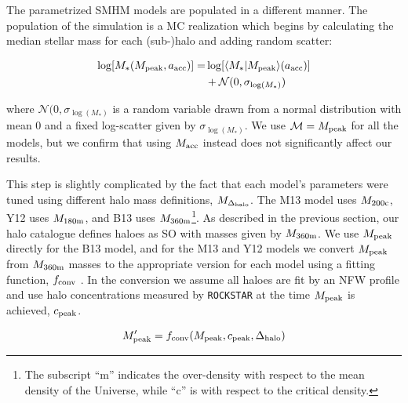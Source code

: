 \documentclass[a4paper,fleqn,usenatbib]{mnras}
\begin{document}
The parametrized SMHM models are populated in a different manner.  The population of the simulation is a MC realization which begins by calculating the median stellar mass for each (sub-)halo and adding random scatter:
%
\begin{linenomath}
\begin{align}
\label{eq:mstar_assign}
\log[M_*(M_{\rm peak}, a_{\rm acc})] =& \log[\langle M_* | M_{\rm peak}\rangle(a_{\rm acc})] \\ \nonumber
&+ \mathcal{N}(0,\sigma_{\log(M_*)})
\end{align}
\end{linenomath}
%
where $\mathcal{N}(0,\sigma_{\log(M_*)}$ is a random variable drawn from a normal distribution with mean 0 and a fixed log-scatter given by $\sigma_{\log(M_*)}$.  We use $\mathcal{M} = M_{\rm peak}$ for all the models, but we confirm that using $M_{\rm acc}$ instead does not significantly affect our results.

This step is slightly complicated by the fact that each model's parameters were tuned using different halo mass definitions, $M_{\Delta_{\rm halo}}$. The M13 model uses $M_{200\rm c}$,  Y12 uses $M_{180\rm m}$, and B13 uses $M_{360\rm m}$\footnote{The subscript ``m'' indicates the over-density with respect to the mean density of the Universe, while ``c'' is with respect to the critical density.}.  As described in the previous section, our halo catalogue defines haloes as SO with masses given by $M_{360\rm m}$.  We use $M_{\rm peak}$ directly for the B13 model, and for the M13 and Y12 models we convert $M_{\rm peak}$ from $M_{360\rm m}$ masses to the appropriate version for each model using a fitting function, $f_{\rm conv}$ \citep[see appendix C in][]{Hu:2003dr}.  In the conversion we assume all haloes are fit by an NFW profile \citep{Navarro:1997if} and use halo concentrations measured by {\tt ROCKSTAR} at the time $M_{\rm peak}$ is achieved, $c_{\rm peak}$.
%
\begin{linenomath}
\begin{equation}
M_{\rm peak}^{\prime} = f_{\rm conv}(M_{\rm peak}, c_{\rm peak}, \Delta_{\rm halo})
\end{equation}
\end{linenomath}
%
\end{document}
